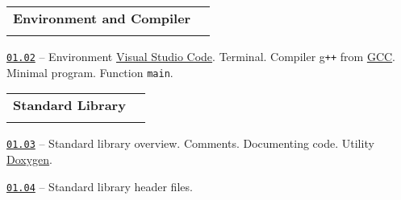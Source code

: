 \documentclass[a4paper,12pt]{article}
\renewenvironment{itemize}
{
    \begin{list}{\labelitemi}
    {
      \setlength{\topsep}{0pt}
      \setlength{\partopsep}{0pt}
      \setlength{\parskip}{0pt}
      \setlength{\itemsep}{0pt}
      \setlength{\parsep}{0pt}
      \setlength{\leftmargin}{14.5pt}
    }
}{\end{list}}
\begin{document}
\bigskip\medskip

\begin{tabular}{!{\vrule width 1pt}L{5.3cm}!{\vrule width 1pt}L{13.7cm}!{\vrule width 0pt}} 


\textbf{Environment and Compiler} & \\


\end{tabular}

\medskip\smallskip

\begin{itemize}

    \item \href{https://github.com/i-s-m-mipt/Education/blob/master/projects/examples/source/01.02.cpp}{\texttt{01.02}} -- Environment \href{https://code.visualstudio.com/}{Visual Studio Code}. Terminal. Compiler g\texttt{++} from \href{https://gcc.gnu.org/}{GCC}. Minimal program. Function \lstinline{main}.
    
\end{itemize}

\bigskip\medskip

\begin{tabular}{!{\vrule width 1pt}L{3.3cm}!{\vrule width 1pt}L{15.7cm}!{\vrule width 0pt}} 


\textbf{Standard Library} & \\


\end{tabular}

\medskip\smallskip

\begin{itemize}

    \item \href{https://github.com/i-s-m-mipt/Education/blob/master/projects/examples/source/01.03.cpp}{\texttt{01.03}} -- Standard library overview. Comments. Documenting code. Utility \href{https://doxygen.nl/}{Doxygen}.

    \smallskip

    \item \href{https://github.com/i-s-m-mipt/Education/blob/master/projects/examples/source/01.04.hpp}{\texttt{01.04}} -- Standard library header files.
    
\end{itemize}
\end{document}
